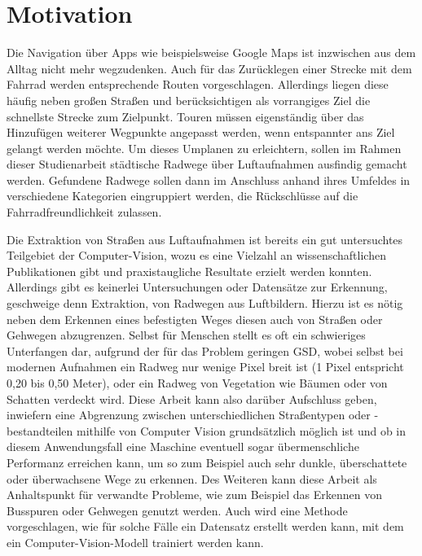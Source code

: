 \chapter{Motivation}

Die Navigation über Apps wie beispielsweise Google Maps ist inzwischen aus dem Alltag nicht mehr wegzudenken.
Auch für das Zurücklegen einer Strecke mit dem Fahrrad werden entsprechende Routen vorgeschlagen.
Allerdings liegen diese häufig neben großen Straßen und berücksichtigen als vorrangiges Ziel die schnellste Strecke zum Zielpunkt.
Touren müssen eigenständig über das Hinzufügen weiterer Wegpunkte angepasst werden, wenn entspannter ans Ziel gelangt werden möchte.
Um dieses Umplanen zu erleichtern, sollen im Rahmen dieser Studienarbeit städtische Radwege über Luftaufnahmen ausfindig gemacht werden.
Gefundene Radwege sollen dann im Anschluss anhand ihres Umfeldes in verschiedene Kategorien eingruppiert werden, die Rückschlüsse auf die Fahrradfreundlichkeit zulassen.

Die Extraktion von Straßen aus Luftaufnahmen ist bereits
ein gut untersuchtes Teilgebiet der Computer-Vision, wozu es eine Vielzahl an wissenschaftlichen Publikationen gibt
und praxistaugliche Resultate erzielt werden konnten. \\
Allerdings gibt es keinerlei Untersuchungen oder Datensätze zur Erkennung, geschweige denn Extraktion, 
von Radwegen aus Luftbildern. Hierzu ist es nötig neben dem Erkennen eines befestigten Weges  
diesen auch von Straßen oder Gehwegen abzugrenzen. Selbst für 
Menschen stellt es oft ein schwieriges Unterfangen dar, aufgrund der für das Problem geringen \ac{GSD}, wobei selbst bei modernen 
Aufnahmen ein Radweg nur wenige Pixel breit ist (1 Pixel entspricht 0,20 bis 0,50 Meter), oder ein Radweg von Vegetation wie Bäumen oder von Schatten verdeckt wird.
Diese Arbeit kann also darüber Aufschluss geben, inwiefern eine Abgrenzung zwischen unterschiedlichen Straßentypen oder -bestandteilen mithilfe von Computer Vision
grundsätzlich möglich ist und ob in diesem Anwendungsfall eine Maschine eventuell sogar übermenschliche Performanz 
erreichen kann, um so zum Beispiel auch sehr dunkle, überschattete oder überwachsene Wege zu erkennen. 
Des Weiteren kann diese Arbeit als Anhaltspunkt für verwandte Probleme, wie zum Beispiel das Erkennen von Busspuren 
oder Gehwegen genutzt werden. Auch wird eine Methode vorgeschlagen, wie für solche Fälle ein Datensatz erstellt werden 
kann, mit dem ein Computer-Vision-Modell trainiert werden kann. 


